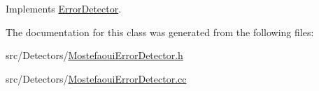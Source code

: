 Implements \hyperlink{class_error_detector_afc717d04768dd207196c08e24163115c}{Error\+Detector}.



The documentation for this class was generated from the following files\+:\begin{DoxyCompactItemize}
\item 
src/\+Detectors/\hyperlink{_mostefaoui_error_detector_8h}{Mostefaoui\+Error\+Detector.\+h}\item 
src/\+Detectors/\hyperlink{_mostefaoui_error_detector_8cc}{Mostefaoui\+Error\+Detector.\+cc}\end{DoxyCompactItemize}

